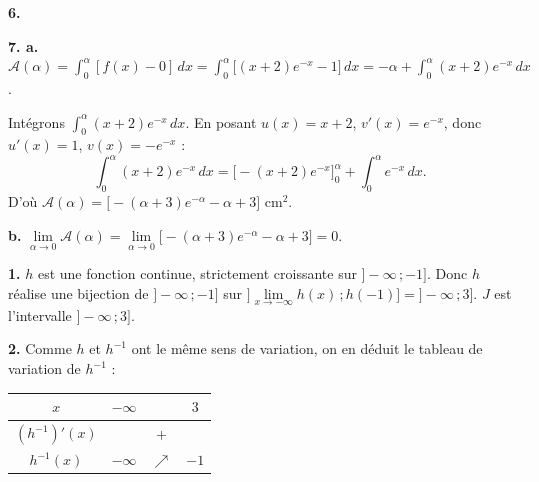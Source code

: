 \documentclass[11pt]{article}
\begin{document}
\textbf{6.}
\begin{center}
\end{center}

\textbf{7. a.} $\mathscr{A}(\alpha) = \displaystyle\int_0^\alpha [f(x) - 0]\,dx = \int_0^\alpha \big[(x+2)e^{-x} - 1\big]\,dx = -\alpha + \int_0^\alpha (x+2)e^{-x}\,dx$.

Intégrons $\displaystyle\int_0^\alpha (x+2)e^{-x}\,dx$. En posant $u(x) = x + 2$, $v'(x) = e^{-x}$, donc $u'(x) = 1$, $v(x) = -e^{-x}$ :
\[ \int_0^\alpha (x+2)e^{-x}\,dx = \Big[-(x+2)e^{-x}\Big]_0^\alpha + \int_0^\alpha e^{-x}\,dx. \]
D'où $\mathscr{A}(\alpha) = \Big[-(\alpha+3)e^{-\alpha} - \alpha + 3\Big]$ cm$^2$.

\textbf{b.} $\lim\limits_{\alpha\to 0}\mathscr{A}(\alpha) = \lim\limits_{\alpha\to 0}\big[-(\alpha+3)e^{-\alpha} - \alpha + 3\big] = 0$.

\textbf{1.} $h$ est une fonction continue, strictement croissante sur $]-\infty\,;-1]$. Donc $h$ réalise une bijection de $]-\infty\,;-1]$ sur $]\lim\limits_{x\to-\infty} h(x)\,;h(-1)] = ]-\infty\,;3]$. $J$ est l'intervalle $]-\infty\,;3]$.

\textbf{2.} Comme $h$ et $h^{-1}$ ont le même sens de variation, on en déduit le tableau de variation de $h^{-1}$ :
\begin{center}\renewcommand{\arraystretch}{1.4}
\begin{tabular}{|c|ccc|}
\hline
$x$ & $-\infty$ & & $3$ \\
\hline
$(h^{-1})'(x)$ & & $+$ & \\
\hline
$h^{-1}(x)$ & $-\infty$ & $\nearrow$ & $-1$ \\
\hline
\end{tabular}
\end{center}
\end{document}
